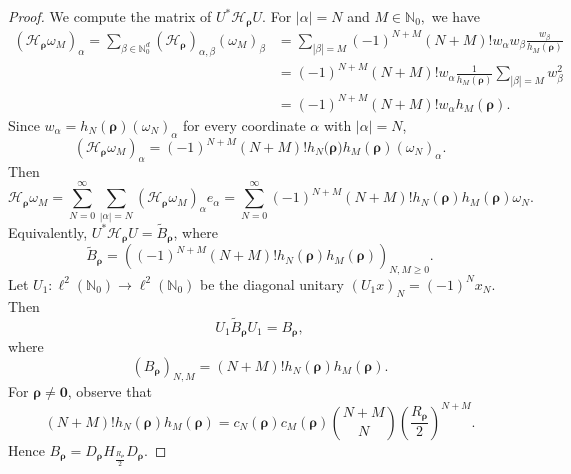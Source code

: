 \documentclass[10pt,a4paper]{amsart}
\begin{document}
\begin{proof}
We compute the matrix of $U^{*}\mathcal{H}_{\boldsymbol{\rho}}U.$ For $|\alpha|=N$ and
$M\in\mathbb{N}_{0},$ we have
\[
\begin{aligned}
(\mathcal{H}_{\boldsymbol{\rho}}\omega_M)_{\alpha}=\sum_{\beta\in\mathbb{N}_0^d}(\mathcal{H}_{\boldsymbol{\rho}})_{\alpha,\beta}(\omega_M)_{\beta}
&=
\sum_{|\beta|=M}
(-1)^{N+M}(N+M)!w_{\alpha}w_{\beta}
\frac{w_{\beta}}{h_M(\boldsymbol{\rho})}                                      \\
&=
(-1)^{N+M}(N+M)!w_{\alpha}
\frac{1}{h_M(\boldsymbol{\rho})}
\sum_{|\beta|=M}w_{\beta}^{2}                              \\
&=
(-1)^{N+M}(N+M)!w_{\alpha}h_M(\boldsymbol{\rho}).
\end{aligned}
\]
Since $w_{\alpha}=h_N(\boldsymbol{\rho})(\omega_N)_{\alpha}$ for every coordinate $\alpha$ with $|\alpha|=N$,
\[
(\mathcal{H}_{\boldsymbol{\rho}}\omega_M)_{\alpha}= (-1)^{N+M}(N+M)!h_N(\boldsymbol{\rho)}h_M(\boldsymbol{\rho})(\omega_N)_{\alpha}.
\]
Then
\[
\mathcal{H}_{\boldsymbol{\rho}}\omega_M
= \sum_{N=0}^{\infty}\sum_{|\alpha|=N}(\mathcal{H}_{\boldsymbol{\rho}}\omega_M)_{\alpha}e_{\alpha}=
\sum_{N=0}^{\infty}
(-1)^{N+M}
(N+M)!h_N(\boldsymbol{\rho})h_M(\boldsymbol{\rho})
\omega_N.
\]
Equivalently, $U^{*}\mathcal{H}_{\boldsymbol{\rho}}U=\widetilde{B}_{\boldsymbol{\rho}}$, where
\[
\widetilde{B}_{\boldsymbol{\rho}}
=
\left(
(-1)^{N+M}(N+M)!h_N(\boldsymbol{\rho})h_M(\boldsymbol{\rho})
\right)_{N,M\geq 0}.
\]
Let $U_1:\ell^{2}(\mathbb{N}_{0})\to\ell^{2}(\mathbb{N}_{0})$
be the diagonal unitary $(U_1x)_N=(-1)^Nx_N.$ Then
\[
U_1\widetilde{B}_{\boldsymbol{\rho}}U_1
=
B_{\boldsymbol{\rho}},
\]
where
\[
(B_{\boldsymbol{\rho}})_{N,M}
=
(N+M)!h_N(\boldsymbol{\rho})h_M(\boldsymbol{\rho}).
\]
For $\boldsymbol{\rho}\neq \mathbf{0}$, observe that
\[
(N+M)!h_N(\boldsymbol{\rho})h_M(\boldsymbol{\rho})
=
c_N(\boldsymbol{\rho})c_M(\boldsymbol{\rho})
\binom{N+M}{N}\left(\frac{R_{\boldsymbol{\rho}}}{2}\right)^{N+M}.
\]
Hence
$B_{\boldsymbol{\rho}}
= D_{\boldsymbol{\rho}}H_{\frac{R_{\boldsymbol{\rho}}}{2}}D_{\boldsymbol{\rho}}.$

\end{proof}
\end{document}
